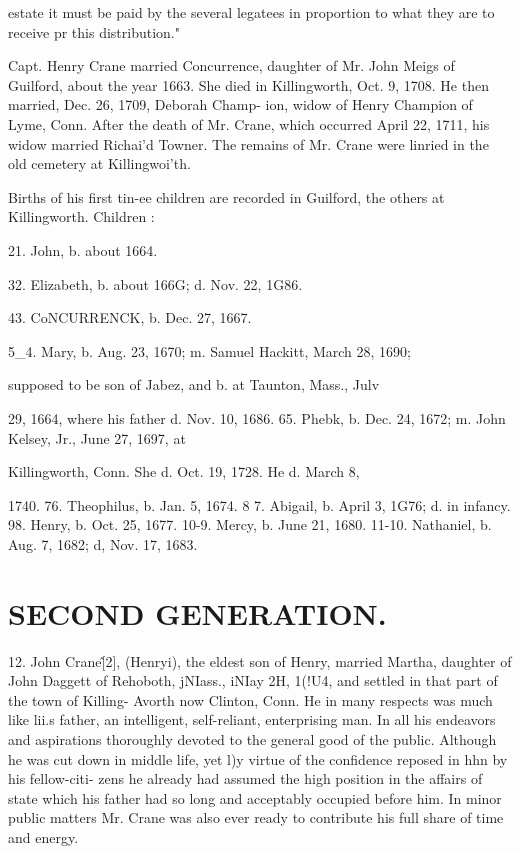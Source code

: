 estate it must be paid by the several legatees in proportion to what they 
are to receive pr this distribution." 

Capt. Henry Crane married Concurrence, daughter of Mr. John 
Meigs of Guilford, about the year 1663. She died in Killingworth, 
Oct. 9, 1708. He then married, Dec. 26, 1709, Deborah Champ- 
ion, widow of Henry Champion of Lyme, Conn. After the death 
of Mr. Crane, which occurred April 22, 1711, his widow married 
Richai'd Towner. The remains of Mr. Crane were linried in the 
old cemetery at Killingwoi'th. 

Births of his first tin-ee children are recorded in Guilford, the 
others at Killingworth. Children : 

21. John, b. about 1664. 

32. Elizabeth, b. about 166G; d. Nov. 22, 1G86. 

43. CoNCURRENCK, b. Dec. 27, 1667. 

5\_4. Mary, b. Aug. 23, 1670; m. Samuel Hackitt, March 28, 1690; 

supposed to be son of Jabez, and b. at Taunton, Mass., Julv 

29, 1664, where his father d. Nov. 10, 1686. 
65. Phebk, b. Dec. 24, 1672; m. John Kelsey, Jr., June 27, 1697, at 

Killingworth, Conn. She d. Oct. 19, 1728. He d. March 8, 

1740. 
76. Theophilus, b. Jan. 5, 1674. 
8  7. Abigail, b. April 3, 1G76; d. in infancy. 
98. Henry, b. Oct. 25, 1677. 
10-9. Mercy, b. June 21, 1680. 
11-10. Nathaniel, b. Aug. 7, 1682; d, Nov. 17, 1683. 



\section{SECOND GENERATION.}


12. John Crane\^ [2], (Henryi), the eldest son of Henry, 
married Martha, daughter of John Daggett of Rehoboth, jNIass., 
iNIay 2H, 1(!U4, and settled in that part of the town of Killing- 
Avorth now Clinton, Conn. He in many respects was much like 
lii.s father, an intelligent, self-reliant, enterprising man. In all 
his endeavors and aspirations thoroughly devoted to the general 
good of the public. Although he was cut down in middle life, 
yet l)y virtue of the confidence reposed in hhn by his fellow-citi- 
zens he already had assumed the high position in the affairs of 
state which his father had so long and acceptably occupied before 
him. In minor public matters Mr. Crane was also ever ready to 
contribute his full share of time and energy. 

